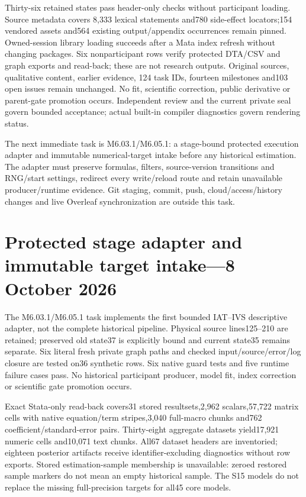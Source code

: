 \documentclass[11pt,a4paper]{article}
\begin{document}
Thirty-six retained states pass header-only checks without participant
loading. Source metadata covers 8,333 lexical statements and780
side-effect locators;154 vendored assets and564 existing output/appendix
occurrences remain pinned. Owned-session library loading succeeds after
a Mata index refresh without changing packages. Six nonparticipant rows
verify protected DTA/CSV and graph exports and read-back; these are not
research outputs. Original sources, qualitative content, earlier evidence,
124 task IDs, fourteen milestones and103 open issues remain unchanged.
No fit, scientific correction, public derivative or parent-gate promotion
occurs. Independent review and the current private seal govern bounded
acceptance; actual built-in compiler diagnostics govern rendering status.

The next immediate task is M6.03.1/M6.05.1: a stage-bound protected
execution adapter and immutable numerical-target intake before any
historical estimation. The adapter must preserve formulas, filters,
source-version transitions and RNG/start settings, redirect every
write/reload route and retain unavailable producer/runtime evidence.
Git staging, commit, push, cloud/access/history changes and live Overleaf
synchronization are outside this task.

\section{Protected stage adapter and immutable target intake---8 October 2026}
The M6.03.1/M6.05.1 task implements the first bounded IAT--IVS descriptive
adapter, not the complete historical pipeline. Physical source lines125--210
are retained; preserved old state37 is explicitly bound and current state35
remains separate. Six literal fresh private graph paths and checked
input/source/error/log closure are tested on36 synthetic rows. Six native
guard tests and five runtime failure cases pass. No historical participant
producer, model fit, index correction or scientific gate promotion occurs.

Exact Stata-only read-back covers31 stored resultsets,2,962 scalars,57,722
matrix cells with native equation/term stripes,3,040 full-macro chunks and762
coefficient/standard-error pairs. Thirty-eight aggregate datasets yield17,921
numeric cells and10,071 text chunks. All67 dataset headers are inventoried;
eighteen posterior artifacts receive identifier-excluding diagnostics without
row exports. Stored estimation-sample membership is unavailable: zeroed
restored sample markers do not mean an empty historical sample. The S15
models do not replace the missing full-precision targets for all45 core models.
\end{document}
